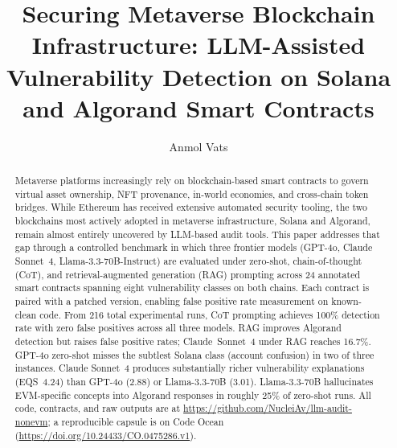 \documentclass[runningheads]{llncs}
\begin{document}
\title{Securing Metaverse Blockchain Infrastructure: LLM-Assisted Vulnerability Detection on Solana and Algorand Smart Contracts}


\author{Anmol Vats}



\maketitle

\begin{abstract}
Metaverse platforms increasingly rely on blockchain-based smart contracts
to govern virtual asset ownership, NFT provenance, in-world economies, and
cross-chain token bridges.
While Ethereum has received extensive automated security tooling, the two
blockchains most actively adopted in metaverse infrastructure, Solana and
Algorand, remain almost entirely uncovered by LLM-based audit tools.
This paper addresses that gap through a controlled benchmark in which three
frontier models (GPT-4o, Claude Sonnet~4, Llama-3.3-70B-Instruct) are
evaluated under zero-shot, chain-of-thought (CoT), and retrieval-augmented
generation (RAG) prompting across 24 annotated smart contracts spanning
eight vulnerability classes on both chains.
Each contract is paired with a patched version, enabling false positive rate
measurement on known-clean code.
From 216 total experimental runs, CoT prompting achieves 100\% detection
rate with zero false positives across all three models.
RAG improves Algorand detection but raises false positive rates; Claude~Sonnet~4
under RAG reaches 16.7\%.
GPT-4o zero-shot misses the subtlest Solana class (account confusion) in two
of three instances.
Claude Sonnet~4 produces substantially richer vulnerability explanations
(EQS~4.24) than GPT-4o (2.88) or Llama-3.3-70B (3.01).
Llama-3.3-70B hallucinates EVM-specific concepts into Algorand responses
in roughly 25\% of zero-shot runs.
All code, contracts, and raw outputs are at
\url{https://github.com/NucleiAv/llm-audit-nonevm};
a reproducible capsule is on Code Ocean
(\url{https://doi.org/10.24433/CO.0475286.v1}).
\end{abstract}
\end{document}

